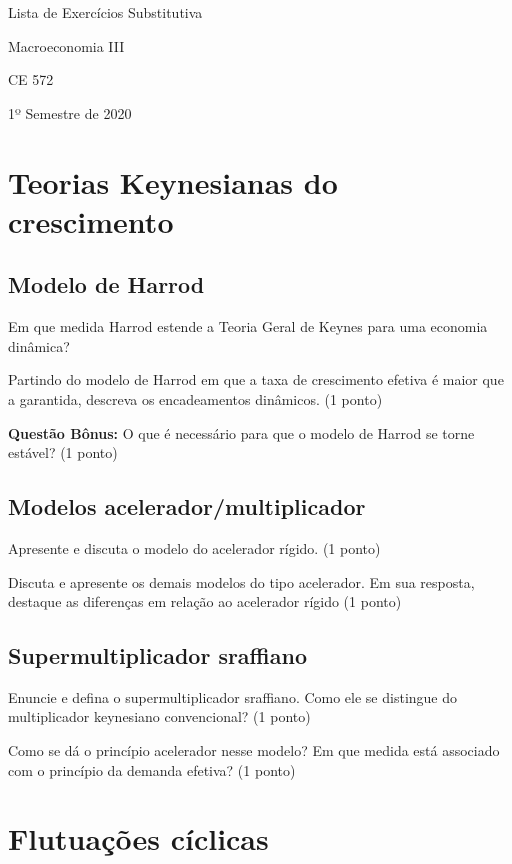 \documentclass[12pt,a4paper]{article}
\begin{document}
	\begin{center}
    {\huge Lista de Exercícios Substitutiva \par}
    {\LARGE Macroeconomia III \par}
    {CE 572 \par}
    {1º Semestre de 2020}
	\end{center}

\section*{Teorias Keynesianas do crescimento}

\subsection*{Modelo de Harrod}

\problem Em que medida Harrod estende a Teoria Geral de Keynes para uma economia dinâmica?

\problem Partindo do modelo de Harrod em que a taxa de crescimento efetiva é maior que a garantida, descreva os encadeamentos dinâmicos. (1 ponto)

\noindent\textbf{Questão Bônus:} O que é necessário para que o modelo de Harrod se torne estável? (1 ponto)

\subsection*{Modelos acelerador/multiplicador}

\problem Apresente e discuta o modelo do acelerador rígido. (1 ponto)

\problem Discuta e apresente os demais modelos do tipo acelerador. Em sua resposta, destaque as diferenças em relação ao acelerador rígido (1 ponto)

\subsection*{Supermultiplicador sraffiano}

\problem Enuncie e defina o supermultiplicador sraffiano. Como ele se distingue do multiplicador keynesiano convencional? (1 ponto)

\problem Como se dá o princípio acelerador nesse modelo? Em que medida está associado com o princípio da demanda efetiva? (1 ponto)

\section*{Flutuações cíclicas}
\end{document}
